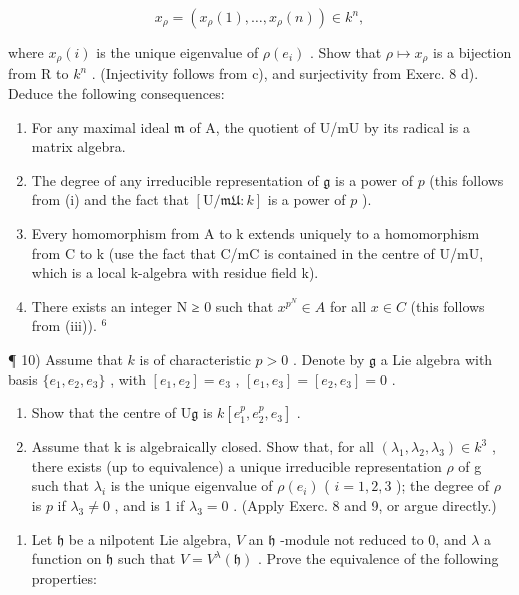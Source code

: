 \[
x _ {\rho} = (x _ {\rho} (1), \dots , x _ {\rho} (n)) \in k ^ {n},
\]

where \(x_{\rho}(i)\) is the unique eigenvalue of \(\rho(e_{i})\) . Show that \(\rho \mapsto x_{\rho}\) is a bijection from R to \(k^{n}\) . (Injectivity follows from c), and surjectivity from Exerc. 8 d). Deduce the following consequences:

\begin{enumerate}
\def\labelenumi{(\roman{enumi})}
\item
  For any maximal ideal \(\mathfrak{m}\) of A, the quotient of U/mU by its radical is a matrix algebra.
\item
  The degree of any irreducible representation of \(\mathfrak{g}\) is a power of \(p\) (this follows from (i) and the fact that \([\mathrm{U} / \mathfrak{mU}:k]\) is a power of \(p\) ).
\item
  Every homomorphism from A to k extends uniquely to a homomorphism from C to k (use the fact that C/mC is contained in the centre of U/mU, which is a local k-algebra with residue field k).
\item
  There exists an integer N ≥ 0 such that \(x^{p^{N}} \in A\) for all \(x \in C\) (this follows from (iii)). \(^{6}\)
\end{enumerate}

¶ 10) Assume that \(k\) is of characteristic \(p > 0\) . Denote by \(\mathfrak{g}\) a Lie algebra with basis \(\{e_1, e_2, e_3\}\) , with \([e_1, e_2] = e_3\) , \([e_1, e_3] = [e_2, e_3] = 0\) .

\begin{enumerate}
\def\labelenumi{\alph{enumi})}
\item
  Show that the centre of \(\mathrm{U}\mathfrak{g}\) is \(k[e_1^p,e_2^p,e_3]\) .
\item
  Assume that k is algebraically closed. Show that, for all \((\lambda_{1},\lambda_{2},\lambda_{3})\in k^{3}\) , there exists (up to equivalence) a unique irreducible representation \(\rho\) of g such that \(\lambda_{i}\) is the unique eigenvalue of \(\rho(e_i)\) ( \(i = 1,2,3\) ); the degree of \(\rho\) is \(p\) if \(\lambda_3 \neq 0\) , and is 1 if \(\lambda_3 = 0\) . (Apply Exerc. 8 and 9, or argue directly.)
\end{enumerate}

\begin{enumerate}
\def\labelenumi{\arabic{enumi})}
\setcounter{enumi}{10}
\tightlist
\item
  Let \(\mathfrak{h}\) be a nilpotent Lie algebra, \(V\) an \(\mathfrak{h}\) -module not reduced to 0, and \(\lambda\) a function on \(\mathfrak{h}\) such that \(V = V^{\lambda}(\mathfrak{h})\) . Prove the equivalence of the following properties:
\end{enumerate}

